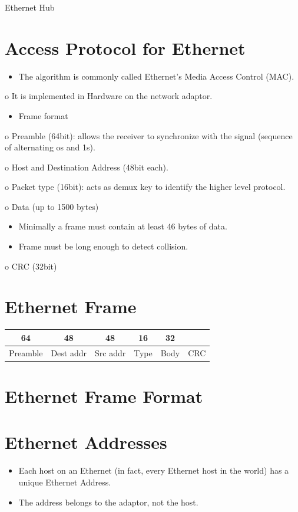 \documentclass[10pt]{article}
\begin{document}
Ethernet Hub

\section{Access Protocol for Ethernet}
\begin{itemize}
  \item The algorithm is commonly called Ethernet's Media Access Control (MAC).
\end{itemize}

o It is implemented in Hardware on the network adaptor.

\begin{itemize}
  \item Frame format
\end{itemize}

o Preamble (64bit): allows the receiver to synchronize with the signal (sequence of alternating os and 1s).

o Host and Destination Address (48bit each).

o Packet type (16bit): acts as demux key to identify the higher level protocol.

o Data (up to 1500 bytes)

\begin{itemize}
  \item Minimally a frame must contain at least 46 bytes of data.

  \item Frame must be long enough to detect collision.

\end{itemize}

o CRC (32bit)

\section{Ethernet Frame}
\begin{center}
\begin{tabular}{|c|c|c|c|c|c|}
64 & 48 & 48 & 16 & 32 &  \\
\hline
Preamble & Dest addr & Src addr & Type & Body & CRC \\
\hline
\end{tabular}
\end{center}

\section{Ethernet Frame Format}
\section{Ethernet Addresses}
\begin{itemize}
  \item Each host on an Ethernet (in fact, every Ethernet host in the world) has a unique Ethernet Address.

  \item The address belongs to the adaptor, not the host.

\end{itemize}
\end{document}
